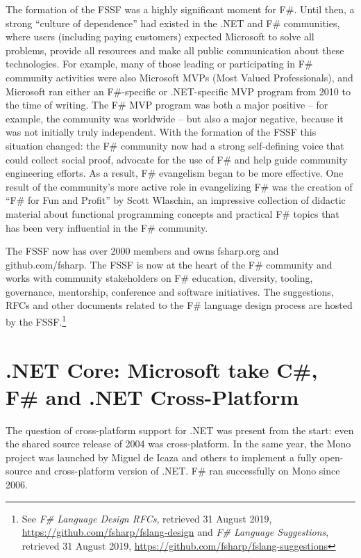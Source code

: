 \documentclass[acmsmall]{acmart}\settopmatter{}
\begin{document}
The formation of the FSSF was a highly significant moment for F\#.  Until then, a strong “culture of dependence” had existed in
the .NET and F\# communities, where users (including paying customers) expected Microsoft to solve all problems, provide all
resources and make all public communication about these technologies.  For example, many of those leading or participating
in F\# community activities were also Microsoft MVPs (Most Valued Professionals), and Microsoft ran either an F\#-specific or
.NET-specific MVP program from 2010 to the time of writing.  The F\# MVP program was both a major positive – for example, the
community was worldwide – but also a major negative, because it was not initially truly independent. With the formation of the
FSSF this situation changed: the F\# community now had a strong self-defining voice that could collect social proof, advocate for
the use of F\# and help guide community engineering efforts. As a result, F\# evangelism began to be more effective. One result of
the community’s more active role in evangelizing F\# was the creation of “F\# for Fun and Profit” by Scott Wlaschin, an impressive
collection of didactic material about functional programming concepts and practical F\# topics that has been very influential in the F\# community.

The FSSF now has over 2000 members and owns fsharp.org and github.com/fsharp. The FSSF is now at the heart of the F\# community
and works with community stakeholders on F\# education, diversity, tooling, governance, mentorship, conference and software
initiatives.  The suggestions, RFCs and other documents related to the F\# language design process are hosted by the
FSSF.\footnote{See \textit{F\# Language Design RFCs}, retrieved 31 August 2019, \url{https://github.com/fsharp/fslang-design} and \textit{F\# Language Suggestions}, retrieved 31 August 2019, \url{https://github.com/fsharp/fslang-suggestions}}

\section*{.NET Core: Microsoft take C\#, F\# and .NET Cross-Platform}

The question of cross-platform support for .NET was present from the start: even the shared source release of 2004 was
cross-platform.  In the same year, the Mono project was launched by Miguel de Icaza and others to implement a fully open-source and
cross-platform version of .NET. F\# ran successfully on Mono since 2006.  
\end{document}
